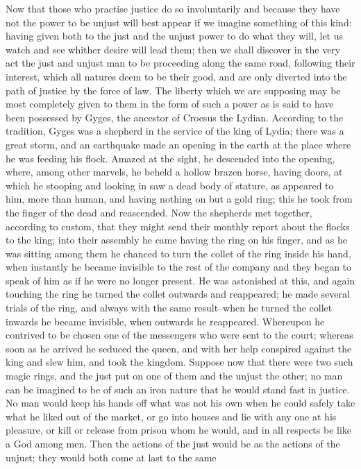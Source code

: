 Now that those who practise justice do so involuntarily and because they
have not the power to be unjust will best appear if we imagine something
of this kind: having given both to the just and the unjust power to do
what they will, let us watch and see whither desire will lead them;
then we shall discover in the very act the just and unjust man to be
proceeding along the same road, following their interest, which all
natures deem to be their good, and are only diverted into the path of
justice by the force of law. The liberty which we are supposing may be
most completely given to them in the form of such a power as is said
to have been possessed by Gyges, the ancestor of Croesus the Lydian.
According to the tradition, Gyges was a shepherd in the service of
the king of Lydia; there was a great storm, and an earthquake made an
opening in the earth at the place where he was feeding his flock. Amazed
at the sight, he descended into the opening, where, among other marvels,
he beheld a hollow brazen horse, having doors, at which he stooping and
looking in saw a dead body of stature, as appeared to him, more than
human, and having nothing on but a gold ring; this he took from the
finger of the dead and reascended. Now the shepherds met together,
according to custom, that they might send their monthly report about the
flocks to the king; into their assembly he came having the ring on his
finger, and as he was sitting among them he chanced to turn the collet
of the ring inside his hand, when instantly he became invisible to the
rest of the company and they began to speak of him as if he were no
longer present. He was astonished at this, and again touching the ring
he turned the collet outwards and reappeared; he made several trials
of the ring, and always with the same result--when he turned the collet
inwards he became invisible, when outwards he reappeared. Whereupon he
contrived to be chosen one of the messengers who were sent to the court;
whereas soon as he arrived he seduced the queen, and with her help
conspired against the king and slew him, and took the kingdom. Suppose
now that there were two such magic rings, and the just put on one of
them and the unjust the other; no man can be imagined to be of such an
iron nature that he would stand fast in justice. No man would keep his
hands off what was not his own when he could safely take what he
liked out of the market, or go into houses and lie with any one at
his pleasure, or kill or release from prison whom he would, and in all
respects be like a God among men. Then the actions of the just would be
as the actions of the unjust; they would both come at last to the same

